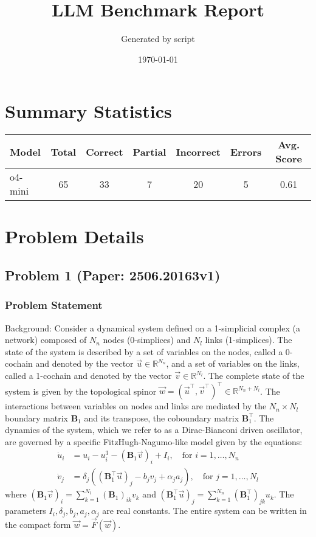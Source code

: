 \documentclass[10pt]{article}
\title{LLM Benchmark Report}
\author{Generated by script}
\date{\today}
\begin{document}
\maketitle

\section*{Summary Statistics}
\begin{center}
\begin{longtable}{|l|c|c|c|c|c|c|}
\hline
\textbf{Model} & \textbf{Total} & \textbf{Correct} & \textbf{Partial} & \textbf{Incorrect} & \textbf{Errors} & \textbf{Avg. Score} \\
\hline
\endfirsthead
\hline
\endfoot
o4-mini & 65 & 33 & 7 & 20 & 5 & 0.61 \\
\hline
\end{longtable}
\end{center}
\section*{Problem Details}

\subsection*{Problem 1 (Paper: 2506.20163v1)}
\subsubsection*{Problem Statement}
Background:
Consider a dynamical system defined on a 1-simplicial complex (a network) composed of $N_n$ nodes (0-simplices) and $N_l$ links (1-simplices). The state of the system is described by a set of variables on the nodes, called a 0-cochain and denoted by the vector $\vec{u} \in \mathbb{R}^{N_n}$, and a set of variables on the links, called a 1-cochain and denoted by the vector $\vec{v} \in \mathbb{R}^{N_l}$. The complete state of the system is given by the topological spinor $\vec{w} = (\vec{u}^\top, \vec{v}^\top)^\top \in \mathbb{R}^{N_n+N_l}$. The interactions between variables on nodes and links are mediated by the $N_n \times N_l$ boundary matrix $\boldsymbol{B}_1$ and its transpose, the coboundary matrix $\boldsymbol{B}_1^\top$. The dynamics of the system, which we refer to as a Dirac-Bianconi driven oscillator, are governed by a specific FitzHugh-Nagumo-like model given by the equations:
\begin{align*}
\dot{u}_i &= u_i - u_i^3 - (\boldsymbol{B}_1\vec{v})_i + I_i, \quad \text{for } i=1, \dots, N_n \\
\dot{v}_j &= \delta_j \left( (\boldsymbol{B}_1^\top\vec{u})_j - b_j v_j + \alpha_j a_j \right), \quad \text{for } j=1, \dots, N_l
\end{align*}
where $(\boldsymbol{B}_1\vec{v})_i = \sum_{k=1}^{N_l} (\boldsymbol{B}_1)_{ik} v_k$ and $(\boldsymbol{B}_1^\top\vec{u})_j = \sum_{k=1}^{N_n} (\boldsymbol{B}_1^\top)_{jk} u_k$. The parameters $I_i, \delta_j, b_j, a_j, \alpha_j$ are real constants. The entire system can be written in the compact form $\dot{\vec{w}} = \vec{F}(\vec{w})$.
\end{document}
